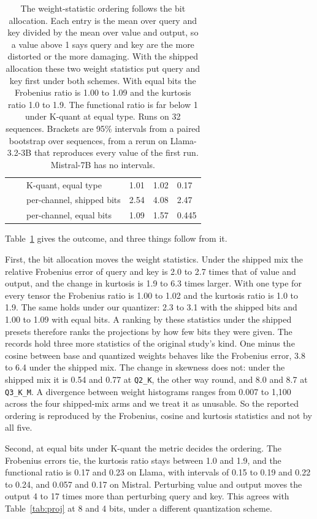\documentclass[10pt]{article}
\begin{document}
\begin{table}[t]
\begin{tabular}{lllrrl}
 & & K-quant, equal type & 1.01 & 1.02 & 0.17 \\
 & & per-channel, shipped bits & 2.54 & 4.08 & 2.47 \\
  & & per-channel, equal bits & 1.09 & 1.57 & 0.445 \\
\bottomrule
\end{tabular}
\caption{The weight-statistic ordering follows the bit allocation. Each entry is the mean over
query and key divided by the mean over value and output, so a value above 1 says query and key
are the more distorted or the more damaging. With the shipped allocation these two weight statistics
put query and key first under both schemes. With equal bits the Frobenius ratio is 1.00 to 1.09
and the kurtosis ratio 1.0 to 1.9. The functional ratio is
far below 1 under K-quant at equal type. Runs on 32 sequences. Brackets are 95\% intervals from
a paired bootstrap over sequences, from a rerun on Llama-3.2-3B that reproduces every value of
the first run. Mistral-7B has no intervals.}
\label{tab:factorial}
\end{table}

Table~\ref{tab:factorial} gives the outcome, and three things follow from it.

First, the bit allocation moves the weight statistics. Under the shipped mix the relative
Frobenius error of query and key is 2.0 to 2.7 times that of value and output, and the change in
kurtosis is 1.9 to 6.3 times larger. With one type for every tensor the Frobenius ratio is 1.00
to 1.02 and the kurtosis ratio is 1.0 to 1.9. The same holds under our quantizer: 2.3 to 3.1 with
the shipped bits and 1.00 to 1.09 with equal bits. A ranking by these statistics under the
shipped presets therefore ranks the projections by how few bits they were given. The records hold
three more statistics of the original study's kind. One minus the cosine between base and
quantized weights behaves like the Frobenius error, 3.8 to 6.4 under the shipped mix. The change
in skewness does not: under the shipped mix it is 0.54 and 0.77 at \texttt{Q2\_K}, the other way
round, and 8.0 and 8.7 at \texttt{Q3\_K\_M}. A divergence between weight histograms ranges from
0.007 to 1{,}100 across the four shipped-mix arms and we treat it as unusable. So the reported
ordering is reproduced by the Frobenius, cosine and kurtosis statistics and not by all five.

Second, at equal bits under K-quant the metric decides the ordering. The Frobenius errors tie,
the kurtosis ratio stays between 1.0 and 1.9, and the functional ratio is 0.17 and 0.23 on Llama, with intervals of 0.15 to 0.19 and
0.22 to 0.24, and 0.057 and 0.17 on Mistral. Perturbing
value and output moves the output 4 to 17 times more than perturbing query and key. This agrees
with Table~\ref{tab:proj} at 8 and 4 bits, under a different quantization scheme.
\end{document}
